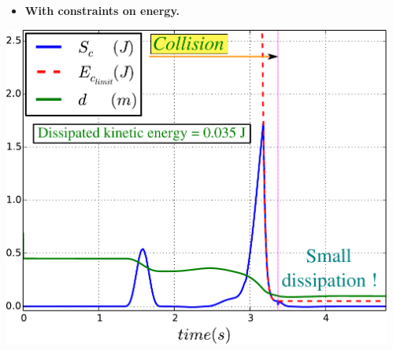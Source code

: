 \begin{frame}
\begin{columns}
\begin{itemize}
\begin{columns}
\begin{center}
\end{center}

\begin{center}
\begin{itemize}
\item \textbf{With constraints on energy.}
\end{itemize}
\vspace{0.5mm}
\includegraphics[width=0.72\columnwidth]{figures/dist_ec_ecmax_plot55}
\\
\hspace{-1mm}
\vspace{0.5mm}

\end{center}

\end{columns}
\end{itemize}
  \end{columns}


\end{frame}


